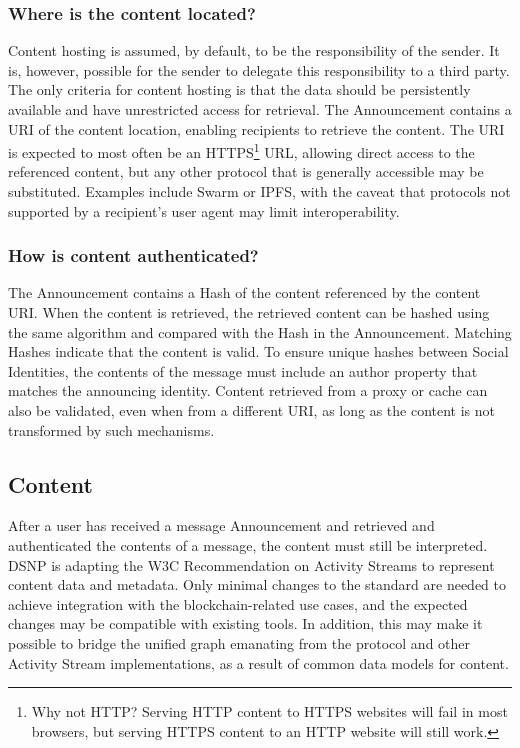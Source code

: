 \documentclass[12pt,letterpaper]{article}
\begin{document}
\subsubsection{Where is the content located?}

Content hosting is assumed, by default, to be the responsibility of the sender. It is,
however, possible for the sender to delegate this responsibility to a third party. The
only criteria for content hosting is that the data should be persistently available and
have unrestricted access for retrieval. The Announcement contains a URI of the content
location, enabling recipients to retrieve the content. The URI is expected to most often
be an HTTPS\footnote{Why not HTTP? Serving HTTP content to HTTPS websites will fail in
	most browsers, but serving HTTPS content to an HTTP website will still work.} URL,
allowing direct access to the referenced content, but any other protocol that is generally
accessible may be substituted. Examples include Swarm or IPFS, with the caveat that
protocols not supported by a recipient's user agent may limit interoperability.

\subsubsection{How is content authenticated?}

The Announcement contains a Hash of the content referenced by the content URI. When the
content is retrieved, the retrieved content can be hashed using the same algorithm and
compared with the Hash in the Announcement. Matching Hashes indicate that the content is
valid. To ensure unique hashes between Social Identities, the contents of the message must
include an author property that matches the announcing identity. Content retrieved from a
proxy or cache can also be validated, even when from a different URI, as long as the
content is not transformed by such mechanisms.

\subsection{Content}\label{sec:content}

After a user has received a message Announcement and retrieved and authenticated the
contents of a message, the content must still be interpreted. DSNP is adapting the W3C
Recommendation on Activity Streams\cite{activitypub} to represent content data and
metadata. Only minimal changes to the standard are needed to achieve integration with the
blockchain-related use cases, and the expected changes may be compatible with existing
tools. In addition, this may make it possible to bridge the unified graph emanating from
the protocol and other Activity Stream implementations, as a result of common data models
for content.
\end{document}
